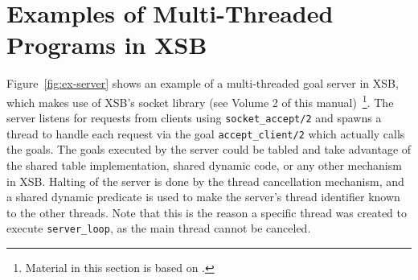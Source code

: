 \section{Examples of Multi-Threaded Programs in XSB} 
%
Figure~\ref{fig:ex-server} shows an example of a multi-threaded goal
server in XSB, which makes use of XSB's socket library (see Volume 2
of this manual)~\footnote{Material in this section is based on
  \cite{Marques07}.}.  The server listens for requests from clients
using {\tt socket\_accept/2} and spawns a thread to handle each
request via the goal {\tt accept\_client/2} which actually calls the
goals.  The goals executed by the server could be tabled and take
advantage of the shared table implementation, shared dynamic code, or
any other mechanism in XSB.  Halting of the server is done by the
thread cancellation mechanism, and a shared dynamic predicate is used
to make the server's thread identifier known to the other
threads. Note that this is the reason a specific thread was created to
execute {\tt server\_loop}, as the main thread cannot be canceled.

